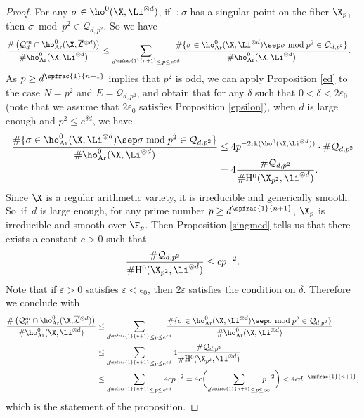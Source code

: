 \begin{proof}
For any $\sigma\in\ho^0(\X,\Li^{\otimes d})$, if $\div\sigma$ has a singular point on the fiber $\X_p$, then $\sigma\bmod p^2\in \mathcal{Q}_{d, p^2}$. So we have
\begin{align*}
\frac{\#\left(\mathcal{Q}_d^{m}\cap \ho^0_{\mathrm{Ar}}(\X, \overline{\mathcal{L}}{}^{\otimes d})\right)}{\#\ho^0_{\mathrm{Ar}}(\X,\Li^{\otimes d})}
&\leq \sum_{d^{\spfrac{1}{n+1}}\leq p \leq e^{\varepsilon d}}\hspace*{-3mm} \frac{\#\{ \sigma\in \ho^0_{\mathrm{Ar}}(\X,\Li^{\otimes d})\sep \sigma\bmod p^2\in \mathcal{Q}_{d,p^2} \}}{\#\ho^0_{\mathrm{Ar}}(\X,\Li^{\otimes d})}.
\end{align*}
As $p\geq d^{\spfrac{1}{n+1}}$ implies that $p^2$ is odd, we can apply Proposition \ref{ed} to the case $N=p^2$ and $E=\mathcal{Q}_{d,p^2}$, and obtain that for any $\delta$ such that $0<\delta<2\varepsilon_0$ (note that we assume that $2\varepsilon_0$ satisfies Proposition \ref{epsilon}), when $d$ is large enough and $p^2\leq e^{\delta d}$, we have
\begin{align*}
\frac{\#\{ \sigma\in \ho^0_{\mathrm{Ar}}(\X,\Li^{\otimes d})\sep \sigma\bmod p^2\in \mathcal{Q}_{d,p^2} \}}{\#\ho^0_{\mathrm{Ar}}(\X,\Li^{\otimes d})}&\leq 4p^{-2\mathrm{rk}(\ho^0(\X,\Li^{\otimes d}))}\cdot \#\mathcal{Q}_{d,p^2} \\[-5pt]
&=4\frac{\#\mathcal{Q}_{d,p^2} }{\#\mathrm{H}^0(\X_{p^2}, \li^{\otimes d})}.
\end{align*}
Since $\X$ is a regular arithmetic variety, it is irreducible and generically smooth. So~if~$d$ is large enough, for any prime number $p\geq d^{\spfrac{1}{n+1}}$, $\X_p$ is irreducible and smooth over $\F_p$. Then Proposition \ref{singmed} tells us that there exists a constant $c>0$ such that
\[
\frac{\#\mathcal{Q}_{d,p^2} }{\#\mathrm{H}^0(\X_{p^2}, \li^{\otimes d})}\leq cp^{-2}.
\]
Note that if $\varepsilon>0$ satisfies $\varepsilon<\epsilon_0$, then $2\varepsilon$ satisfies the condition on $\delta$. Therefore we conclude with
\begin{align*}
\frac{\#\left(\mathcal{Q}_d^{m}\cap \ho^0_{\mathrm{Ar}}(\X, \overline{\mathcal{L}}{}^{\otimes d})\right)}{\#\ho^0_{\mathrm{Ar}}(\X,\Li^{\otimes d})} &\leq \sum_{d^{\spfrac{1}{n+1}}\leq p \leq e^{\varepsilon d}}\hspace*{-3mm} \frac{\#\{ \sigma\in \ho^0_{\mathrm{Ar}}(\X,\Li^{\otimes d})\sep \sigma\bmod p^2\in \mathcal{Q}_{d,p^2} \}}{\#\ho^0_{\mathrm{Ar}}(\X,\Li^{\otimes d})}\\
&\leq \sum_{d^{\spfrac{1}{n+1}}\leq p \leq e^{\varepsilon d}}4\frac{\#\mathcal{Q}_{d,p^2} }{\#\mathrm{H}^0(\X_{p^2}, \li^{\otimes d})} \\
&\leq \sum_{d^{\spfrac{1}{n+1}}\leq p \leq e^{\varepsilon d}} \hspace*{-4mm}4cp^{-2} = 4c\biggl(\sum_{d^{\spfrac{1}{n+1}}\leq p \leq \infty} \hspace*{-4mm}p^{-2}\biggr)< 4c d^{-\spfrac{1}{n+1}},
\end{align*}
which is the statement of the proposition.
\end{proof}

